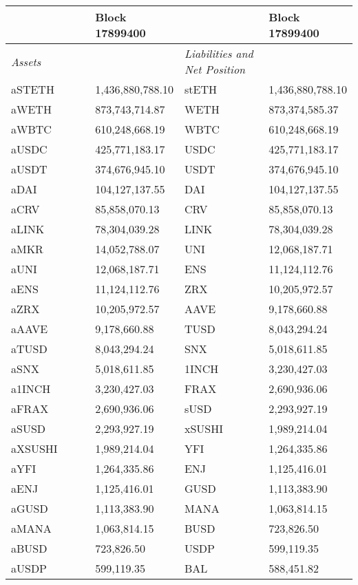 
\begin{longtable}{@{}p{0.25\linewidth}p{0.25\linewidth}p{0.25\linewidth}p{0.25\linewidth}@{}}

\toprule


& Block 17899400 & & Block 17899400 \\

\midrule
\textit{Assets} & & \textit{Liabilities and Net Position} \\
aSTETH & 1,436,880,788.10 & stETH &1,436,880,788.10 \\
aWETH & 873,743,714.87 & WETH &873,374,585.37 \\
aWBTC & 610,248,668.19 & WBTC &610,248,668.19 \\
aUSDC & 425,771,183.17 & USDC &425,771,183.17 \\
aUSDT & 374,676,945.10 & USDT &374,676,945.10 \\
aDAI & 104,127,137.55 & DAI &104,127,137.55 \\
aCRV & 85,858,070.13 & CRV &85,858,070.13 \\
aLINK & 78,304,039.28 & LINK &78,304,039.28 \\
aMKR & 14,052,788.07 & UNI &12,068,187.71 \\
aUNI & 12,068,187.71 & ENS &11,124,112.76 \\
aENS & 11,124,112.76 & ZRX &10,205,972.57 \\
aZRX & 10,205,972.57 & AAVE &9,178,660.88 \\
aAAVE & 9,178,660.88 & TUSD &8,043,294.24 \\
aTUSD & 8,043,294.24 & SNX &5,018,611.85 \\
aSNX & 5,018,611.85 & 1INCH &3,230,427.03 \\
a1INCH & 3,230,427.03 & FRAX &2,690,936.06 \\
aFRAX & 2,690,936.06 & sUSD &2,293,927.19 \\
aSUSD & 2,293,927.19 & xSUSHI &1,989,214.04 \\
aXSUSHI & 1,989,214.04 & YFI &1,264,335.86 \\
aYFI & 1,264,335.86 & ENJ &1,125,416.01 \\
aENJ & 1,125,416.01 & GUSD &1,113,383.90 \\
aGUSD & 1,113,383.90 & MANA &1,063,814.15 \\
aMANA & 1,063,814.15 & BUSD &723,826.50 \\
aBUSD & 723,826.50 & USDP &599,119.35 \\
aUSDP & 599,119.35 & BAL &588,451.82 \\

\end{longtable}
